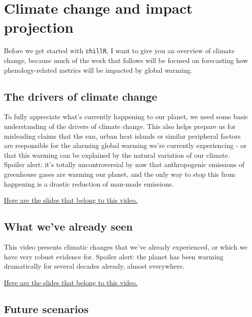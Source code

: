 \documentclass[
]{book}
\begin{document}
\hypertarget{climate-change-and-impact-projection}{%
\chapter{Climate change and impact projection}\label{climate-change-and-impact-projection}}

Before we get started with \texttt{chillR}, I want to give you an overview of climate change, because much of the work that follows will be focused on forecasting how phenology-related metrics will be impacted by global warming.

\hypertarget{the-drivers-of-climate-change}{%
\section{The drivers of climate change}\label{the-drivers-of-climate-change}}

To fully appreciate what's currently happening to our planet, we need some basic understanding of the drivers of climate change. This also helps prepare us for misleading claims that the sun, urban heat islands or similar peripheral factors are responsible for the alarming global warming we're currently experiencing - or that this warming can be explained by the natural variation of our climate. Spoiler alert: it's totally uncontroversial by now that anthropogenic emissions of greenhouse gases are warming our planet, and the only way to stop this from happening is a drastic reduction of man-made emissions.

\href{https://uni-bonn.sciebo.de/s/b4iTBE82S1CVNx1}{Here are the slides that belong to this video.}

\hypertarget{what-weve-already-seen}{%
\section{What we've already seen}\label{what-weve-already-seen}}

This video presents climatic changes that we've already experienced, or which we have very robust evidence for. Spoiler alert: the planet has been warming dramatically for several decades already, almost everywhere.

\href{https://uni-bonn.sciebo.de/s/5kLiGT77nZyM21w}{Here are the slides that belong to this video.}

\hypertarget{future-scenarios}{%
\section{Future scenarios}\label{future-scenarios}}
\end{document}
